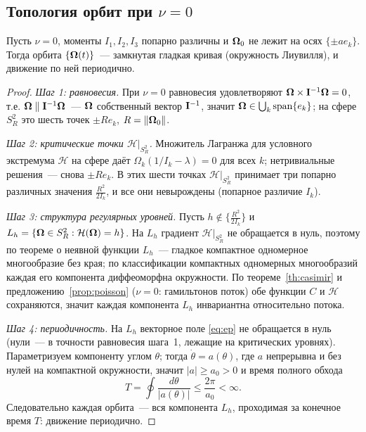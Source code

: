 \subsection{Топология орбит при \texorpdfstring{$\nu=0$}{nu=0}}

\begin{proposition}[периодичность]\label{prop:periodic}
Пусть $\nu = 0$, моменты $I_1, I_2, I_3$ попарно различны и
$\boldsymbol{\Omega}_0$ не лежит на осях $\{ \pm a e_k \}$. Тогда орбита
$\{\boldsymbol{\Omega}(t)\}$~--- замкнутая гладкая кривая (окружность Лиувилля),
и движение по ней периодично.
\end{proposition}

\begin{proof}
\emph{Шаг 1: равновесия.} При $\nu = 0$ равновесия удовлетворяют
$\boldsymbol{\Omega}\times\mathbf{I}^{-1}\boldsymbol{\Omega} = 0$, т.е. $\boldsymbol{\Omega} \parallel \mathbf{I}^{-1}\boldsymbol{\Omega}$~---
$\boldsymbol{\Omega}$ собственный вектор $\mathbf{I}^{-1}$, значит $\boldsymbol{\Omega} \in \bigcup_k
\operatorname{span}\{e_k\}$; на сфере $S^2_R$ это шесть точек
$\pm Re_k$, $R = \|\boldsymbol{\Omega}_0\|$.

\emph{Шаг 2: критические точки $\mathcal H|_{S^2_R}$.} Множитель
Лагранжа для условного экстремума $\mathcal H$ на сфере даёт
$\Omega_k(1/I_k - \lambda) = 0$ для всех $k$; нетривиальные решения~---
снова $\pm Re_k$. В этих шести точках $\mathcal H|_{S^2_R}$ принимает
три попарно различных значения $\tfrac{R^2}{2I_k}$, и все они
невырождены (попарное различие $I_k$).

\emph{Шаг 3: структура регулярных уровней.} Пусть
$h \notin \{\tfrac{R^2}{2I_k}\}$ и
$L_h = \{\boldsymbol{\Omega} \in S^2_R : \mathcal H(\boldsymbol{\Omega}) = h\}$. На $L_h$ градиент
$\mathcal H|_{S^2_R}$ не обращается в нуль, поэтому по теореме о
неявной функции $L_h$~--- гладкое компактное одномерное многообразие
без края; по классификации компактных одномерных многообразий каждая
его компонента диффеоморфна окружности. По теореме~\ref{th:casimir} и
предложению~\ref{prop:poisson} ($\nu = 0$: гамильтонов поток) обе
функции $C$ и $\mathcal H$ сохраняются, значит каждая компонента
$L_h$ инвариантна относительно потока.

\emph{Шаг 4: периодичность.} На $L_h$ векторное поле \eqref{eq:ep} не
обращается в нуль (нули~--- в точности равновесия шага~1, лежащие на
критических уровнях). Параметризуем компоненту углом $\theta$; тогда
$\dot\theta = a(\theta)$, где $a$ непрерывна и без нулей на
компактной окружности, значит $|a| \ge a_0 > 0$ и время полного
обхода
\[
  T = \oint \frac{d\theta}{|a(\theta)|} \le \frac{2\pi}{a_0} < \infty .
\]
Следовательно каждая орбита~--- вся компонента $L_h$, проходимая за
конечное время $T$: движение периодично.
\end{proof}

